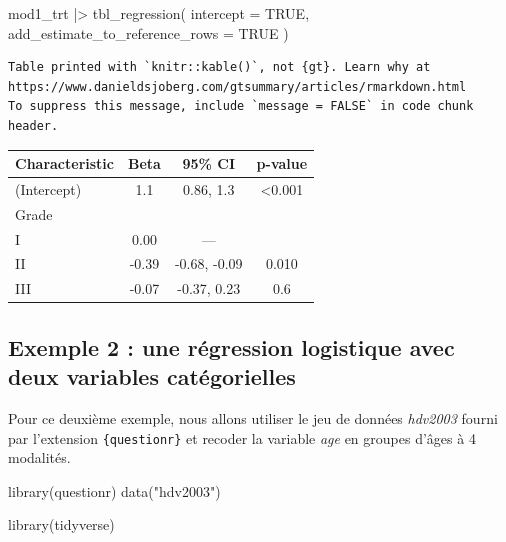 \documentclass[
  letterpaper,
  DIV=11,
  numbers=noendperiod,
  oneside]{scrreprt}
\newenvironment{Shaded}{\begin{snugshade}}{\end{snugshade}}
\newcommand{\AttributeTok}[1]{\textcolor[rgb]{0.40,0.45,0.13}{#1}}
\newcommand{\ConstantTok}[1]{\textcolor[rgb]{0.56,0.35,0.01}{#1}}
\newcommand{\FunctionTok}[1]{\textcolor[rgb]{0.28,0.35,0.67}{#1}}
\newcommand{\NormalTok}[1]{\textcolor[rgb]{0.00,0.23,0.31}{#1}}
\newcommand{\SpecialCharTok}[1]{\textcolor[rgb]{0.37,0.37,0.37}{#1}}
\newcommand{\StringTok}[1]{\textcolor[rgb]{0.13,0.47,0.30}{#1}}
\begin{document}
\begin{Shaded}
\begin{Highlighting}[]
\NormalTok{mod1\_trt }\SpecialCharTok{|\textgreater{}}
  \FunctionTok{tbl\_regression}\NormalTok{(}
    \AttributeTok{intercept =} \ConstantTok{TRUE}\NormalTok{, }
    \AttributeTok{add\_estimate\_to\_reference\_rows =} \ConstantTok{TRUE}
\NormalTok{  )}
\end{Highlighting}
\end{Shaded}

\begin{verbatim}
Table printed with `knitr::kable()`, not {gt}. Learn why at
https://www.danieldsjoberg.com/gtsummary/articles/rmarkdown.html
To suppress this message, include `message = FALSE` in code chunk header.
\end{verbatim}

\begin{longtable}[]{@{}lccc@{}}
\toprule()
\textbf{Characteristic} & \textbf{Beta} & \textbf{95\% CI} &
\textbf{p-value} \\
\midrule()
\endhead
(Intercept) & 1.1 & 0.86, 1.3 & \textless0.001 \\
Grade & & & \\
I & 0.00 & --- & \\
II & -0.39 & -0.68, -0.09 & 0.010 \\
III & -0.07 & -0.37, 0.23 & 0.6 \\
\bottomrule()
\end{longtable}

\hypertarget{exemple-2-une-ruxe9gression-logistique-avec-deux-variables-catuxe9gorielles}{%
\subsection{Exemple 2 : une régression logistique avec deux variables
catégorielles}\label{exemple-2-une-ruxe9gression-logistique-avec-deux-variables-catuxe9gorielles}}

Pour ce deuxième exemple, nous allons utiliser le jeu de données
\emph{hdv2003} fourni par l'extension \texttt{\{questionr\}} et recoder
la variable \emph{age} en groupes d'âges à 4 modalités.

\begin{Shaded}
\begin{Highlighting}[]
\FunctionTok{library}\NormalTok{(questionr)}
\FunctionTok{data}\NormalTok{(}\StringTok{"hdv2003"}\NormalTok{)}

\FunctionTok{library}\NormalTok{(tidyverse)}
\end{Highlighting}
\end{Shaded}
\end{document}
